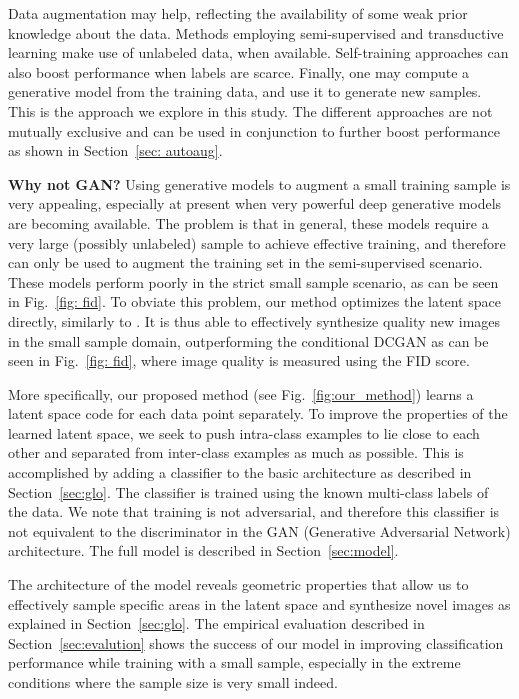\documentclass[a4paper,conference]{IEEEtran}
\begin{document}
Data augmentation may help, reflecting the availability of some weak prior knowledge about the data. Methods employing semi-supervised \cite{odena2016semi} and transductive learning \cite{vapnik1998statistical} make use of unlabeled data, when available. Self-training approaches can also boost performance when labels are scarce. Finally, one may compute a generative model from the training data, and use it to generate new samples. This is the approach we explore in this study. The different approaches are not mutually exclusive and can be used in conjunction to further boost performance as shown in Section~\ref{sec: autoaug}.

\textbf{Why not GAN?}
Using generative models to augment a small training sample is very appealing, especially at present when very powerful deep generative models are becoming available. The problem is that in general, these models require a very large (possibly unlabeled) sample to achieve effective training, and therefore can only be used to augment the training set in the semi-supervised scenario. These models perform poorly in the strict small sample scenario, as can be seen in Fig.~\ref{fig: fid}. To obviate this problem, our method optimizes the latent space directly, similarly to \cite{pmlr-v80-bojanowski18a}. It is thus able to effectively synthesize quality new images in the small sample domain, outperforming the conditional DCGAN as can be seen in Fig.~\ref{fig: fid}, where image quality is measured using the FID score.

More specifically, our proposed method (see Fig.~\ref{fig:our_method}) learns a latent space code for each data point separately. To improve the properties of the learned latent space, we seek to push intra-class examples to lie close to each other and separated from inter-class examples as much as possible. This is accomplished by adding a classifier to the basic architecture as described in  Section~\ref{sec:glo}. The classifier is trained using the known multi-class labels of the data. We note that training is not adversarial, and therefore this classifier is not equivalent to the discriminator in the GAN (Generative Adversarial Network) architecture. The full model is described in Section~\ref{sec:model}. 

The architecture of the model reveals geometric properties that allow us to effectively sample specific areas in the latent space and synthesize novel images as explained in Section~\ref{sec:glo}. 
The empirical evaluation described in Section~\ref{sec:evalution} shows the success of our model in improving classification performance while training with a small sample, especially in the extreme conditions where the sample size is very small indeed.
\end{document}
